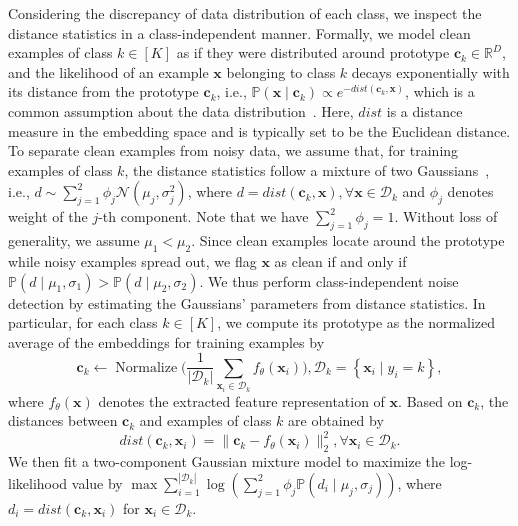 \documentclass{article}
\def\c{{\boldsymbol c}}
\def\x{{\boldsymbol x}}
\def\DD{{\mathcal D}}
\begin{document}
Considering the discrepancy of data distribution of each class, we inspect the distance statistics in a class-independent manner. Formally, we model clean examples of class $k \in [K]$ as if they were distributed around prototype $\c_k \in \mathbb{R}^{D}$, and the likelihood of an example $\x$ belonging to class $k$ decays exponentially with its distance from the prototype $\c_k$, i.e., $\mathbb{P}(\x \mid \c_k) \propto e^{ -dist(\c_k, \x) }$, which is a common assumption about the data distribution~\cite{DBLP:conf/nips/GoldbergerRHS04,DBLP:journals/corr/abs-2104-03066}. Here, $dist$ is a distance measure in the embedding space and is typically set to be the Euclidean distance. 
To separate clean examples from noisy data, we assume that, for training examples of class $k$, the distance statistics follow a mixture of two Gaussians~\cite{DBLP:journals/pr/PermuterFJ06}, i.e., $d \sim \sum_{j=1}^{2} \phi_j \mathcal{N}(\mu_j, \sigma_j^2)$, where $d = dist(\c_k, \x), \forall \x \in \mathcal{D}_k$ and $\phi_j$ denotes weight of the $j$-th component. Note that we have $\sum_{j=1}^2 \phi_j = 1$. Without loss of generality, we assume $\mu_1 < \mu_2$. Since clean examples locate around the prototype while noisy examples spread out, we flag $\x$ as clean if and only if $\mathbb{P}(d \mid \mu_1, \sigma_1) > \mathbb{P}(d \mid \mu_2, \sigma_2)$.
We thus perform class-independent noise detection by estimating the Gaussians' parameters from distance statistics.
In particular, for each class $k \in [K]$, we compute its prototype as the normalized average of the embeddings for training examples by
\begin{equation}\label{equ:compute-prototype}
\boldsymbol{c}_{k} \leftarrow \operatorname{Normalize}\bigg( \frac{1}{|\mathcal{D}_k|} \sum_{\x_i \in \mathcal{D}_k } f_\theta (\x_i) \bigg), \mathcal{D}_k = \left\{\x_i \mid y_{i}=k\right\},
\end{equation}
where $f_\theta(\x)$ denotes the extracted feature representation of $\x$. Based on $\c_k$, the distances between $\c_k$ and examples of class $k$ are obtained by
\begin{equation}\label{equ:distance}
    dist(\c_k, \x_i) = \big\|\c_k - f_\theta(\x_i) \big\|_2^2, \forall \x_i \in \mathcal{D}_k.
\end{equation}
We then fit a two-component Gaussian mixture model to maximize the log-likelihood value by $\max \sum_{i=1}^{|\DD_k|} \log (\sum_{j=1}^2 \phi_j \mathbb{P}(d_i \mid \mu_j, \sigma_j))$, where $d_i = dist(\c_k, \x_i)$ for $\x_i \in \mathcal{D}_k$.
\end{document}
